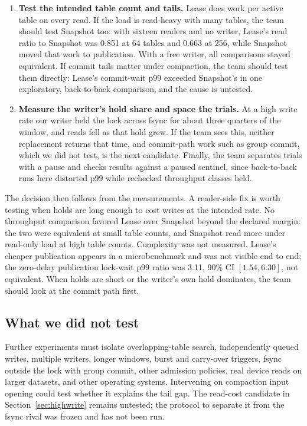 \documentclass[conference]{IEEEtran}
\begin{document}
\begin{enumerate}
\item \textbf{Test the intended table count and tails.} Lease does work per active table on every read. If the load is read-heavy with many tables, the team should test Snapshot too: with sixteen readers and no writer, Lease's read ratio to Snapshot was 0.851 at 64 tables and 0.663 at 256, while Snapshot moved that work to publication. With a free writer, all comparisons stayed equivalent. If commit tails matter under compaction, the team should test them directly: Lease's commit-wait p99 exceeded Snapshot's in one exploratory, back-to-back comparison, and the cause is untested.
\item \textbf{Measure the writer's hold share and space the trials.} At a high write rate our writer held the lock across fsync for about three quarters of the window, and reads fell as that hold grew. If the team sees this, neither replacement returns that time, and commit-path work such as group commit, which we did not test, is the next candidate. Finally, the team separates trials with a pause and checks results against a paused sentinel, since back-to-back runs here distorted p99 while rechecked throughput classes held.
\end{enumerate}
The decision then follows from the measurements. A reader-side fix is worth testing when holds are long enough to cost writes at the intended rate. No throughput comparison favored Lease over Snapshot beyond the declared margin: the two were equivalent at small table counts, and Snapshot read more under read-only load at high table counts. Complexity was not measured. Lease's cheaper publication appears in a microbenchmark and was not visible end to end; the zero-delay publication lock-wait p99 ratio was 3.11, 90\% CI $[1.54,6.30]$, not equivalent. When holds are short or the writer's own hold dominates, the team should look at the commit path first.

\subsection{What we did not test}
Further experiments must isolate overlapping-table search, independently queued writes, multiple writers, longer windows, burst and carry-over triggers, fsync outside the lock with group commit, other admission policies, real device reads on larger datasets, and other operating systems. Intervening on compaction input opening could test whether it explains the tail gap. The read-cost candidate in Section~\ref{sec:highwrite} remains untested; the protocol to separate it from the fsync rival was frozen and has not been run.
\end{document}
